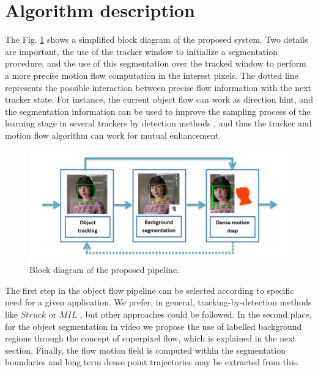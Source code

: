 \section{Algorithm description}
\label{sec:desc}

The Fig. \ref{figurelabel_sys} shows a simplified block diagram of the proposed system. Two details are important, 
the use of the tracker window to initialize a segmentation procedure, and the use of this segmentation over the tracked window 
to perform a more precise motion flow computation in the interest pixels. The dotted line represents the possible interaction 
between precise flow information with the next tracker state. For instance, the current object flow can work as direction hint, and 
the segmentation information can be used to improve the sampling process of the learning stage in several trackers by detection methods \cite{c22}, and 
thus the tracker and motion flow algorithm can work for mutual enhancement.

   \begin{figure}[thpb]
      \centering
      \includegraphics[width=1.00\textwidth]{../images/system.png}
      \caption{Block diagram of the proposed pipeline.}
      \label{figurelabel_sys}
   \end{figure}

The first step in the object flow pipeline can be selected according to specific need for a given application. We prefer, in general, tracking-by-detection methods 
like $Struck$ \cite{c22} or $MIL$ \cite{c23}, but other approaches could be followed. In the second place, for the object segmentation in video we propose the use 
of labelled background regions through the concept of superpixel flow, which is explained in the next section. Finally, the flow motion field is computed within the segmentation boundaries and long term dense 
point trajectories may be extracted from this.

